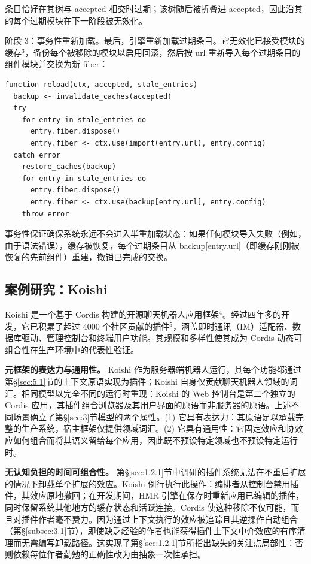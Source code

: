 条目恰好在其树与 accepted 相交时过期；该树随后被折叠进 accepted，因此沿其的每个过期模块在下一阶段被无效化。

阶段 3：事务性重新加载。最后，引擎重新加载过期条目。它无效化已接受模块的缓存$^3$，备份每个被移除的模块以启用回滚，然后按 url 重新导入每个过期条目的组件模块并交换为新 fiber：

\begin{lstlisting}[caption={事务性模块重新加载}]
function reload(ctx, accepted, stale_entries)
  backup <- invalidate_caches(accepted)
  try
    for entry in stale_entries do
      entry.fiber.dispose()
      entry.fiber <- ctx.use(import(entry.url), entry.config)
  catch error
    restore_caches(backup)
    for entry in stale_entries do
      entry.fiber.dispose()
      entry.fiber <- ctx.use(backup[entry.url], entry.config)
    throw error
\end{lstlisting}

事务性保证确保系统永远不会进入半重加载状态：如果任何模块导入失败（例如，由于语法错误），缓存被恢复，每个过期条目从 backup[entry.url]（即缓存刚刚被恢复的先前组件）重建，撤销已完成的交换。

\subsection{案例研究：Koishi}\label{sec:5.3}

Koishi 是一个基于 Cordis 构建的开源聊天机器人应用框架$^4$。经过四年多的开发，它已积累了超过 4000 个社区贡献的插件$^5$，涵盖即时通讯（IM）适配器、数据库驱动、管理控制台和终端用户功能。其规模和多样性使其成为 Cordis 动态可组合性在生产环境中的代表性验证。

\textbf{元框架的表达力与通用性。} Koishi 作为服务器端机器人运行，其每个功能都通过第\S\ref{sec:5.1}节的上下文原语实现为插件；Koishi 自身仅贡献聊天机器人领域的词汇。相同模型以完全不同的运行时重现：Koishi 的 Web 控制台是第二个独立的 Cordis 应用，其插件组合浏览器及其用户界面的原语而非服务器的原语。上述不同场景确立了第\S\ref{sec:3}节模型的两个属性。(1) 它具有表达力：其原语足以承载完整的生产系统，宿主框架仅提供领域词汇。(2) 它具有通用性：它固定效应和协效应如何组合而将其语义留给每个应用，因此既不预设特定领域也不预设特定运行时。

\textbf{无认知负担的时间可组合性。} 第\S\ref{sec:1.2.1}节中调研的插件系统无法在不重启扩展的情况下卸载单个扩展的效应。Koishi 例行执行此操作：编排者从控制台禁用插件，其效应原地撤回；在开发期间，HMR 引擎在保存时重新应用已编辑的插件，同时保留系统其他地方的缓存状态和活跃连接。Cordis 使这种移除不仅可能，而且对插件作者毫不费力。因为通过上下文执行的效应被追踪且其逆操作自动组合（第\S\ref{subsec:3.1}节），即使缺乏经验的作者也能获得插件上下文中介效应的有序清理而无需编写卸载路径。这实现了第\S\ref{sec:1.2.1}节所指出缺失的关注点局部性：否则依赖每位作者勤勉的正确性改为由抽象一次性承担。

